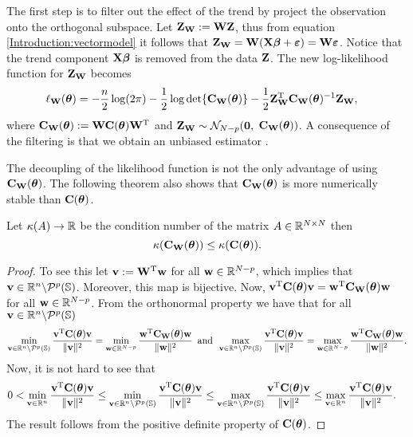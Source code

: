 \documentclass[11pt,final]{amsart}       %
\begin{document}
The first step is to filter out the effect of the trend by project the
observation onto the orthogonal subspace.  Let $\mathbf{Z}_{\mathbf{W}}: = \mathbf{W} \mathbf{Z}$,
thus from equation \eqref{Introduction:vectormodel} it follows that
$\mathbf{Z}_{\mathbf{W}} = {\bf W} ({\mathbf{X} \boldsymbol{\beta}}+ {\boldsymbol \varepsilon}) = {\bf
  W{\boldsymbol \varepsilon}}$. Notice that the trend component ${\mathbf{X}}
\boldsymbol{\beta}$ is removed from the data ${\bf Z}$. The new log-likelihood
function for $\mathbf{Z}_{\mathbf{W}}$ becomes
\begin{equation}
  \begin{split}
\ell_{\mathbf{W}}(\boldsymbol{\theta})
&=-\frac{n}{2}\log(2\pi)-\frac{1}{2}\log
\det\{\mathbf{C}_{\mathbf{W}}(\boldsymbol{\theta})\} 
-\frac{1}{2}\mathbf{Z}_{\mathbf{W}}^{\rm T}\mathbf{C}_{\mathbf{W}}(\boldsymbol{\theta})^{-1}\mathbf{Z}_{\mathbf{W}},
\end{split}
\label{Introduction:multilevelloglikelihood}
\end{equation}
where $\mathbf{C}_{\mathbf{W}}(\boldsymbol{\theta}) := \mathbf{W} \mathbf{C}(\boldsymbol{\theta}) \mathbf{W} ^{\rm T}$ and
$\mathbf{Z}_{\mathbf{W}}\sim {\mathcal N}_{N-p}(\mathbf{0},$ $\mathbf{C}_{\mathbf{W}}(\boldsymbol{\theta}))$.  A consequence
of the filtering is that we obtain an unbiased estimator
\cite{Castrillon2015}.

The decoupling of the likelihood function is not the only advantage of
using $\mathbf{C}_{\mathbf{W}}(\boldsymbol{\theta})$. The following theorem also shows that
$\mathbf{C}_{\mathbf{W}}(\boldsymbol{\theta})$ is more numerically stable than $\mathbf{C}(\boldsymbol{\theta})$.

\begin{prop} 
\label{Multilevelapproach:theo1}
Let $\kappa(A) \rightarrow \Bbb{R}$ be the condition number of the matrix
$A \in \Bbb{R}^{N \times N}$ then
\[
\kappa(\mathbf{C}_{\mathbf{W}}(\boldsymbol{\theta})) \leq 
\kappa(\mathbf{C}(\boldsymbol{\theta})).
\]
\end{prop}
\noindent 
\begin{proof}
To see this let $\mathbf{v} := \mathbf{W}^{\rm T} \mathbf{w}$ for all $\mathbf{w} \in \Bbb{R}^{N-p}$, which
implies that $\mathbf{v} \in \mathbb{R}^{n} \backslash
{\mathcal P}^{p}(\mathbb{S})$. Moreover, this map is bijective.  Now, $\mathbf{v} ^{\rm T}
\mathbf{C}(\boldsymbol{\theta}) \mathbf{v} = \mathbf{w} ^{\rm T} \mathbf{C}_{\mathbf{W}}(\boldsymbol{\theta}) \mathbf{w}$ for all $\mathbf{w} \in
\Bbb{R}^{N-p}$. From the orthonormal property we have that for all $\mathbf{v} \in
\mathbb{R}^{n} \backslash {\mathcal P}^{p}(\mathbb{S})$
\[
\begin{split}
\min_{\mathbf{v} \in \mathbb{R}^{n} \backslash {\mathcal P}^{p}(\mathbb{S})} \frac{\mathbf{v}^{\rm T}\mathbf{C}(\boldsymbol{\theta})\mathbf{v}}
{\|\mathbf{v}\|^2} 
= \min_{\mathbf{w} \in \mathbb{R}^{N-p} } \frac{\mathbf{w}^{\rm T}\mathbf{C}_{\mathbf{W}}(\boldsymbol{\theta})\mathbf{w}}{\|\mathbf{w}\|^2} 
\,\,\,
\mbox{and}
\,\,\,
\max_{\mathbf{v} \in \mathbb{R}^{n} \backslash {\mathcal P}^{p}(\mathbb{S}) } \frac{\mathbf{v}^{\rm T}\mathbf{C}(\boldsymbol{\theta})\mathbf{v}}
{\|\mathbf{v}\|^2}  
= \max_{\mathbf{w} \in \mathbb{R}^{N-p}} \frac{\mathbf{w}^{\rm T}\mathbf{C}_{\mathbf{W}}(\boldsymbol{\theta})\mathbf{w}}{\|\mathbf{w}\|^2}.
\end{split}
\]
Now, it is not hard to see that
\[
\begin{split}
  0
  &<
  \min_{\mathbf{v} \in \mathbb{R}^{n}} \frac{\mathbf{v}^{\rm T}\mathbf{C}(\boldsymbol{\theta})\mathbf{v}}{ \|\mathbf{v}\|^{2} } 
\leq 
\min_{\mathbf{v} \in \mathbb{R}^{n} \backslash {\mathcal P}^{p}(\mathbb{S})}
 \frac{\mathbf{v}^{\rm T}\mathbf{C}(\boldsymbol{\theta})\mathbf{v}}{ \|\mathbf{v}\|^{2} }
\leq \max_{\mathbf{v} \in \mathbb{R}^{n} \backslash {\mathcal P}^{p}(\mathbb{S})} \frac{\mathbf{v}^{\rm T}\mathbf{C}(\boldsymbol{\theta})\mathbf{v}}
{ \|\mathbf{v}\|^{2} } 
\leq
\max_{\mathbf{v} \in \mathbb{R}^{n}} \frac{\mathbf{v}^{\rm T}\mathbf{C}(\boldsymbol{\theta})\mathbf{v}}{ \|\mathbf{v}\|^{2} }.
\end{split}
\]
The result follows from the positive definite property of
$\mathbf{C}(\boldsymbol{\theta})$.
\end{proof}
\end{document}
